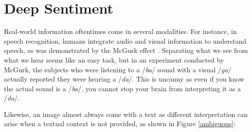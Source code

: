 \chapter{Deep Sentiment}

Real-world information oftentimes come in several modalities. For instance, in speech recognition, humans integrate audio and visual information to understand speech, as was demonstrated by the McGurk effect \cite{mcgurk}. Separating what we see from what we hear seems like an easy task, but in an experiment conducted by McGurk, the subjects who were listening to a /{\em ba}/ sound with a visual /{\em ga}/ actually reported they were hearing a /{\em da}/. This is uncanny as even if you know the actual sound is a /{\em ba}/, you cannot stop your brain from interpreting it as a /{\em da}/.

Likewise, an image almost always come with a text as different interpretation can arise when a textual context is not provided, as shown in Figure \ref{ambiguous}:

